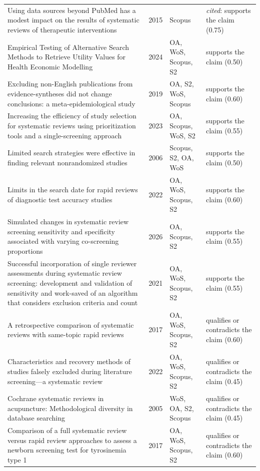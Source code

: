 \begin{longtable}{@{}%
  >{\raggedright\arraybackslash}p{}c%
  >{\raggedright\arraybackslash}p{}%
  >{\raggedright\arraybackslash}p{}@{}}
Using data sources beyond PubMed has a modest impact on the results of systematic reviews of therapeutic interventions & 2015 & Scopus & \emph{cited}: supports the claim (0.75) \\
Empirical Testing of Alternative Search Methods to Retrieve Utility Values for Health Economic Modelling & 2024 & OA, WoS, Scopus, S2 & supports the claim (0.50) \\
Excluding non-English publications from evidence-syntheses did not change conclusions: a meta-epidemiological study & 2019 & OA, S2, WoS, Scopus & supports the claim (0.60) \\
Increasing the efficiency of study selection for systematic reviews using prioritization tools and a single-screening approach & 2023 & OA, Scopus, WoS, S2 & supports the claim (0.55) \\
Limited search strategies were effective in finding relevant nonrandomized studies & 2006 & Scopus, S2, OA, WoS & supports the claim (0.50) \\
Limits in the search date for rapid reviews of diagnostic test accuracy studies & 2022 & OA, WoS, Scopus, S2 & supports the claim (0.60) \\
Simulated changes in systematic review screening sensitivity and specificity associated with varying co-screening proportions & 2026 & OA, Scopus, S2 & supports the claim (0.55) \\
Successful incorporation of single reviewer assessments during systematic review screening: development and validation of sensitivity and work-saved of an algorithm that considers exclusion criteria and count & 2021 & OA, WoS, Scopus, S2 & supports the claim (0.55) \\
A retrospective comparison of systematic reviews with same-topic rapid reviews & 2017 & OA, WoS, Scopus, S2 & qualifies or contradicts the claim (0.60) \\
Characteristics and recovery methods of studies falsely excluded during literature screening---a systematic review & 2022 & OA, WoS, Scopus, S2 & qualifies or contradicts the claim (0.45) \\
Cochrane systematic reviews in acupuncture: Methodological diversity in database searching & 2005 & WoS, OA, S2, Scopus & qualifies or contradicts the claim (0.45) \\
Comparison of a full systematic review versus rapid review approaches to assess a newborn screening test for tyrosinemia type 1 & 2017 & OA, WoS, Scopus, S2 & qualifies or contradicts the claim (0.60) \\

\end{longtable}

